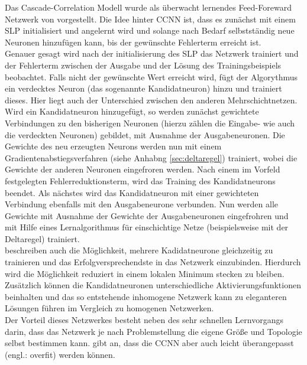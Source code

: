 Das Cascade-Correlation Modell wurde als überwacht lernendes Feed-Foreward Netzwerk von \citet{Fahlman1990} vorgestellt. Die Idee hinter CCNN ist, dass es zunächst mit einem SLP initialisiert und angelernt wird und solange nach Bedarf selbstständig neue Neuronen hinzufügen kann, bis der gewünschte Fehlerterm erreicht ist.\\
Genauer gesagt wird nach der initialisierung des SLP das Netzwerk trainiert und der Fehlerterm zwischen der Ausgabe und der Lösung des Trainingsbeispiels beobachtet. Falls nicht der gewünschte Wert erreicht wird, fügt der Algorythmus ein verdecktes Neuron (das sogenannte Kandidatneuron) hinzu und trainiert dieses. Hier liegt auch der Unterschied zwischen den anderen Mehrschichtnetzen. Wird ein Kandidatneuron hinzugefügt, so werden zunächst gewichtete Verbindungen zu den bisherigen Neuronen (hierzu zählen die Eingabe- wie auch die verdeckten Neuronen) gebildet, mit Ausnahme der Ausgabeneuronen. Die Gewichte des neu erzeugten Neurons werden nun mit einem Gradientenabstiegsverfahren (siehe Anhabng \ref{sec:deltaregel}) trainiert, wobei die Gewichte der anderen Neuronen eingefroren werden. Nach einem im Vorfeld festgelegten Fehlerreduktionsterm, wird das Training des Kandidatneurons beendet. Als nächstes wird das Kandidatneuron mit einer gewichteten Verbindung ebenfalls mit den Ausgabeneurone verbunden. Nun werden alle Gewichte mit Ausnahme der Gewichte der Ausgabeneuronen eingefrohren und mit Hilfe eines Lernalgorithmus für einschichtige Netze (beispielsweise mit der Deltaregel) trainiert.\\
\citet{Fahlman1990} beschreiben auch die Möglichkeit, mehrere Kadidatneurone gleichzeitig zu trainieren und das Erfolgversprechendste in das Netzwerk einzubinden. Hierdurch wird die Möglichkeit reduziert in einem lokalen Minimum stecken zu bleiben. Zusätzlich können die Kandidatneuronen unterschiedliche Aktivierungsfunktionen beinhalten und das so entstehende inhomogene Netzwerk kann zu eleganteren Lösungen führen im Vergleich zu homogenen Netzwerken.\\
Der Vorteil dieses Netzwerkes besteht neben des sehr schnellen Lernvorgangs darin, dass das Netzwerk je nach Problemstellung die eigene Größe und Topologie selbst bestimmen kann. \citet{Balazs2009} gibt an, dass die CCNN aber auch leicht überangepasst (engl.: overfit) werden können.\\

